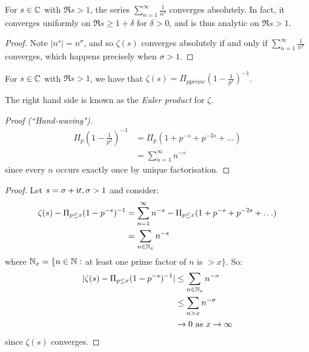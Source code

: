 \documentclass[10pt,a4paper]{article}
\begin{document}
\begin{lemma}
For $s \in \mathbb{C}$ with $\Re s > 1$, the series $\sum_{n=1}^\infty \frac{1}{n^s}$ converges absolutely. In fact, it converges uniformly on $\Re s \geq 1+\delta$ for $\delta > 0$, and is thus analytic on $\Re s > 1$.
\end{lemma}
\begin{proof}
Note $|n^s| = n^{\sigma}$, and so $\zeta(s)$ converges absolutely if and only if $\sum_{n=1}^{\infty} \frac{1}{n^{\sigma}}$ converges, which happens precisely when $\sigma > 1$.
\end{proof}

\begin{theorem}
For $s \in \mathbb{C}$ with $\Re s >1$, we have that $\zeta(s) = \Pi_{p prime}\left(1-\frac{1}{p^s}\right)^{-1}$.
\end{theorem}
The right hand side is known as the \emph{Euler product} for $\zeta$.
\begin{proof}[Proof (``Hand-waving")]
\begin{align*}
\Pi_{p}\left(1-\frac{1}{p^2}\right)^{-1} &= \Pi_p \left(1+p^{-s} + p^{-2s} + \ldots \right)\\
&= \sum_{n=1}^{\infty} n^{-s}
\end{align*}
since every $n$ occurs exactly once by unique factorisation.
\end{proof}
\begin{proof}
Let $s = \sigma+\mathfrak{i} t, \sigma>1$ and consider:
\begin{align*}
\zeta(s) - \Pi_{p\leq x} (1-p^{-s})^{-1} &= \sum_{n=1}^{\infty} n^{-s} - \Pi_{p\leq x} (1+p^{-s} + p^{-2s} + \ldots)\\
&= \sum_{n\in \mathbb{N}_x} n^{-s}
\end{align*}
where $\mathbb{N}_x = \{n \in \mathbb{N} : $ at least one prime factor of $n$ is $> x \}$. So:
\begin{align*}
|\zeta(s) - \Pi_{p\leq x}(1-p^{-s})^{-1}| &\leq \sum_{n \in \mathbb{N}_x} n^{-\sigma}\\
&\leq \sum_{n > x} n^{-\sigma}\\
&\to 0 \text{ as } x \to \infty
\end{align*}
since $\zeta(s)$ converges.
\end{proof}
\end{document}
